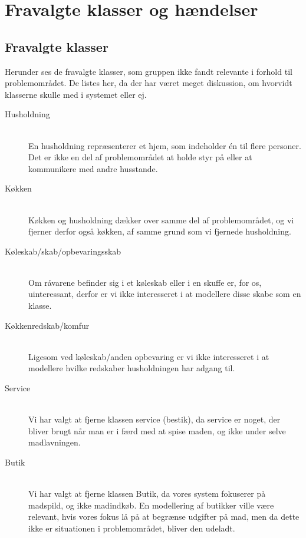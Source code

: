 \chapter{Fravalgte klasser og hændelser}
\label{ap:fravalgteklasseroghaendelser}

\section{Fravalgte klasser}
\label{ap:fravalgteklasser}
Herunder ses de fravalgte klasser, som gruppen ikke fandt relevante i forhold til problemområdet. De listes her, da der har været meget diskussion, om hvorvidt klasserne skulle med i systemet eller ej.

\begin{description}
\item[Husholdning] \hfill \\
En husholdning repræsenterer et hjem, som indeholder én til flere personer. Det er ikke en del af problemområdet at holde styr på eller at kommunikere med andre husstande.

\item[Køkken] \hfill \\
Køkken og husholdning dækker over samme del af problemområdet, og vi fjerner derfor også køkken, af samme grund som vi fjernede husholdning.

\item[Køleskab/skab/opbevaringsskab] \hfill \\
Om råvarene befinder sig i et køleskab eller i en skuffe er, for os, uinteressant, derfor er vi ikke interesseret i at modellere disse skabe som en klasse.

\item[Køkkenredskab/komfur] \hfill \\
Ligesom ved køleskab/anden opbevaring er vi ikke interesseret i at modellere hvilke redskaber husholdningen har adgang til.

\item[Service] \hfill \\ 
Vi har valgt at fjerne klassen service (bestik), da service er noget, der bliver brugt når man er i færd med at spise maden, og ikke under selve madlavningen.

\item[Butik] \hfill \\
Vi har valgt at fjerne klassen Butik, da vores system fokuserer på madspild, og ikke madindkøb. En modellering af butikker ville være relevant, hvis vores fokus lå på at begrænse udgifter på mad, men da dette ikke er situationen i problemområdet, bliver den udeladt.


\end{description}
